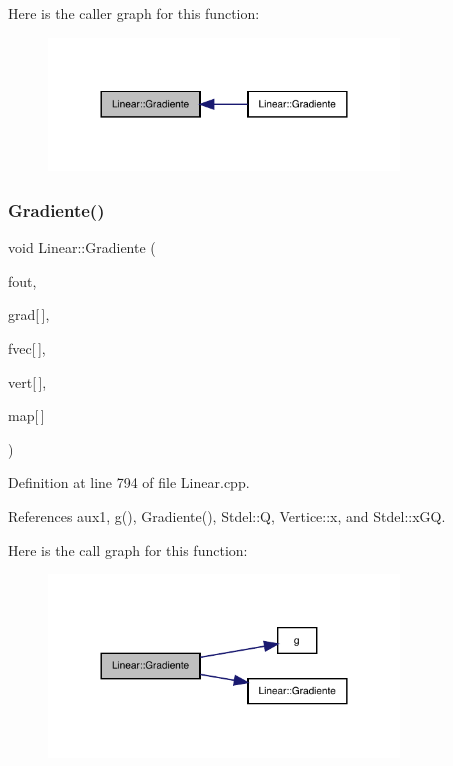 Here is the caller graph for this function\+:
\nopagebreak
\begin{figure}[H]
\begin{center}
\leavevmode
\includegraphics[width=264pt]{classLinear_a0bd1d5250b909768d8d88eb0d1c31eda_icgraph}
\end{center}
\end{figure}
\mbox{\label{classLinear_a44cf1ecaefc5ad9e72325aed57df10ff}} 
\subsubsection{\texorpdfstring{Gradiente()}{Gradiente()}\hspace{0.1cm}{\footnotesize\ttfamily [2/6]}}
{\footnotesize\ttfamily void Linear\+::\+Gradiente (\begin{DoxyParamCaption}\item[{F\+I\+LE $\ast$}]{fout,  }\item[{double $\ast$}]{grad\mbox{[}$\,$\mbox{]},  }\item[{const double}]{fvec\mbox{[}$\,$\mbox{]},  }\item[{const \hyperlink{structVertice}{Vertice}}]{vert\mbox{[}$\,$\mbox{]},  }\item[{const int}]{map\mbox{[}$\,$\mbox{]} }\end{DoxyParamCaption})\hspace{0.3cm}{\ttfamily [virtual]}}



Definition at line 794 of file Linear.\+cpp.



References aux1, g(), Gradiente(), Stdel\+::Q, Vertice\+::x, and Stdel\+::x\+GQ.

Here is the call graph for this function\+:
\nopagebreak
\begin{figure}[H]
\begin{center}
\leavevmode
\includegraphics[width=264pt]{classLinear_a44cf1ecaefc5ad9e72325aed57df10ff_cgraph}
\end{center}
\end{figure}
\mbox{\label{classLinear_a5e2e5bfdc6a755dfa22338fa8b9a60ba}} 
